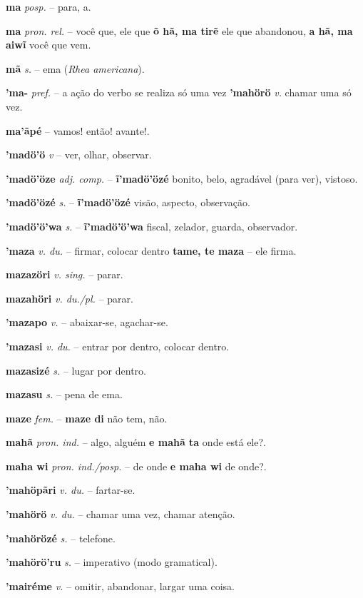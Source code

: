 \textbf{ma} \textit{posp.} -- para, a.

\textbf{ma} \textit{pron. rel.} -- você que, ele que  \textbf{õ hã, ma tirẽ} ele que abandonou, \textbf{a hã, ma aiwĩ} você que vem.

\textbf{mã} \textit{s.} -- ema (\textit{Rhea americana}).

\textbf{'ma-} \textit{pref.} -- a ação do verbo se realiza só uma vez  \textbf{'mahörö} \textit{v.} chamar uma só vez.

\textbf{ma'ãpé} -- vamos! então! avante!.

\textbf{'madö'ö} \textit{v} -- ver, olhar, observar.

\textbf{'madö'öze} \textit{adj. comp.} -- \textbf{ĩ'madö'özé} bonito, belo, agradável (para ver), vistoso.

\textbf{'madö'özé} \textit{s.} -- \textbf{ĩ'madö'özé} visão, aspecto, observação.

\textbf{'madö'ö'wa} \textit{s.} -- \textbf{ĩ'madö'ö'wa} fiscal, zelador, guarda, observador.

\textbf{'maza} \textit{v. du.} -- firmar, colocar dentro  \textbf{tame, te maza} -- ele firma.

\textbf{mazazöri} \textit{v. sing.} -- parar.

\textbf{mazahöri} \textit{v. du./pl.} -- parar.

\textbf{'mazapo} \textit{v.} -- abaixar-se, agachar-se.

\textbf{'mazasi} \textit{v. du.} -- entrar por dentro, colocar dentro.

\textbf{mazasizé} \textit{s.} -- lugar por dentro.

\textbf{mazasu} \textit{s.} -- pena de ema.

\textbf{maze} \textit{fem.} -- \textbf{maze di} não tem, não.

\textbf{mahã} \textit{pron. ind.} -- algo, alguém  \textbf{e mahã ta} onde está ele?.

\textbf{maha wi} \textit{pron. ind./posp.} -- de onde  \textbf{e maha wi} de onde?.

\textbf{'mahöpãri} \textit{v. du.} -- fartar-se.

\textbf{'mahörö} \textit{v. du.} -- chamar uma vez, chamar atenção.

\textbf{'mahörözé} \textit{s.} -- telefone.

\textbf{'mahörö'ru} \textit{s.} -- imperativo (modo gramatical).

\textbf{'mairéme} \textit{v.} -- omitir, abandonar, largar uma coisa.

